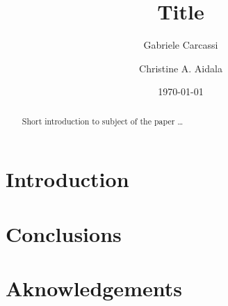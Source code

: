 \documentclass{article}
\title{Title}
\author[1]{Gabriele Carcassi}
\author[1]{Christine A. Aidala}
\affil[1]{
	Physics Department\\
	University of Michigan
	}
\date{\today}
\begin{document}
\maketitle


\begin{abstract}
Short introduction to subject of the paper \ldots 
\end{abstract}

\section{Introduction}



\section{Conclusions}

\section*{Aknowledgements}



\end{document}
